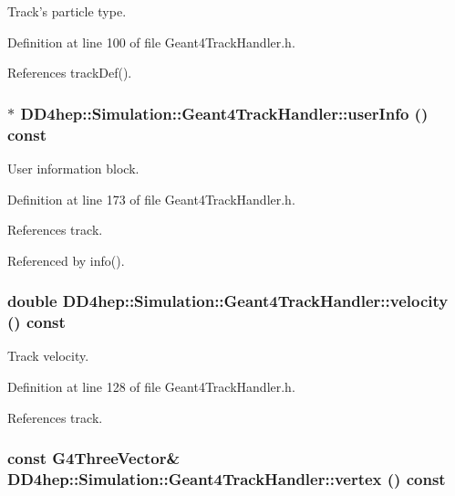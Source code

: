 Track's particle type. 

Definition at line 100 of file Geant4TrackHandler.h.

References trackDef().\hypertarget{class_d_d4hep_1_1_simulation_1_1_geant4_track_handler_afb2d00560f0fda5d1b9b1323e56adefb}{
\subsubsection[{userInfo}]{$\ast$ DD4hep::Simulation::Geant4TrackHandler::userInfo () const}}
\label{class_d_d4hep_1_1_simulation_1_1_geant4_track_handler_afb2d00560f0fda5d1b9b1323e56adefb}


User information block. 

Definition at line 173 of file Geant4TrackHandler.h.

References track.

Referenced by info().\hypertarget{class_d_d4hep_1_1_simulation_1_1_geant4_track_handler_a48537f6a5370efc3246fa3656412a677}{
\subsubsection[{velocity}]{\setlength{\rightskip}{0pt plus 5cm}double DD4hep::Simulation::Geant4TrackHandler::velocity () const}}
\label{class_d_d4hep_1_1_simulation_1_1_geant4_track_handler_a48537f6a5370efc3246fa3656412a677}


Track velocity. 

Definition at line 128 of file Geant4TrackHandler.h.

References track.\hypertarget{class_d_d4hep_1_1_simulation_1_1_geant4_track_handler_a2cfe782eee6aa47c77510395f5fe65f4}{
\subsubsection[{vertex}]{\setlength{\rightskip}{0pt plus 5cm}const G4ThreeVector\& DD4hep::Simulation::Geant4TrackHandler::vertex () const}}
\label{class_d_d4hep_1_1_simulation_1_1_geant4_track_handler_a2cfe782eee6aa47c77510395f5fe65f4}


